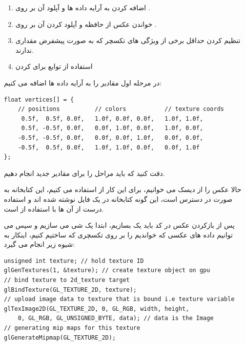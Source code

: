 \documentclass[a4paper, 12pt]{book}
\newcommand{\lrbold}[1]{\lr{\textbf{#1}}}
\newcommand{\lrit}[1]{\lr{\textit{#1}}}
\begin{document}
\begin{persian}
    \begin{enumerate}
      \item اضافه کردن  به آرایه داده ها و آپلود آن بر روی .
      \item خواندن عکس از حافظه و آپلود کردن آن بر روی .
      \item تنظیم کردن حداقل برخی از ویژگی های تکسچر که به صورت پیشفرض مقداری ندارند.
      \item استفاده از توابع  برای  کردن 
    \end{enumerate}
\end{persian}

\newpage

    در مرحله اول مقادیر  را به آرایه داده ها اضافه می کنیم:
    \begin{LTR}
    \small
        \begin{lstlisting}[style=C++Style,caption=\lrit{position and color data in one array}]
float vertices[] = {
    // positions          // colors           // texture coords
     0.5f,  0.5f, 0.0f,   1.0f, 0.0f, 0.0f,   1.0f, 1.0f,
     0.5f, -0.5f, 0.0f,   0.0f, 1.0f, 0.0f,   1.0f, 0.0f,
    -0.5f, -0.5f, 0.0f,   0.0f, 0.0f, 1.0f,   0.0f, 0.0f,
    -0.5f,  0.5f, 0.0f,   1.0f, 1.0f, 0.0f,   0.0f, 1.0f
};
        \end{lstlisting}
    \end{LTR}
    \normalsize
    \vspace*{0.3cm}

    دقت کنید که باید مراحل  را برای مقادیر جدید انجام دهیم.

    حالا عکس را از دیسک می خوانیم، برای این کار از \href{https://github.com/nothings/stb}{\lrbold{stbi\_image}} استفاده می کنیم، این کتابخانه به صورت  در دسترس است، این گونه کتابخانه در یک فایل نوشته شده اند و استفاده درست از آن ها با استفاده از  است.

    پس از بازکردن عکس در کد باید یک  بسازیم، ابتدا یک شی می سازیم و سپس می توانیم داده های عکسی که خواندیم را بر روی تکسچری که ساختیم  کنیم، اینکار به شیوه زیر انجام می گیرد:

    \begin{LTR}
    \small
        \begin{lstlisting}[style=C++Style,caption=\lrit{load and upload data to gpu}]
unsigned int texture; // hold texture ID
glGenTextures(1, &texture); // create texture object on gpu
// bind texture to 2d_texture target
glBindTexture(GL_TEXTURE_2D, texture);
// upload image data to texture that is bound i.e texture variable
glTexImage2D(GL_TEXTURE_2D, 0, GL_RGB, width, height,
    0, GL_RGB, GL_UNSIGNED_BYTE, data); // data is the Image
// generating mip maps for this texture
glGenerateMipmap(GL_TEXTURE_2D);
        \end{lstlisting}
    \end{LTR}
    \normalsize
    \vspace*{0.3cm}
\end{document}
